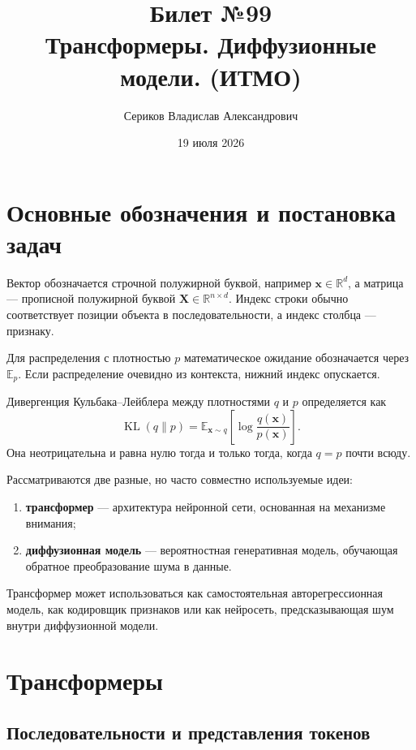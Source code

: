 \documentclass[12pt,a4paper]{article}
\title{Билет №99 \\ \small Трансформеры. Диффузионные модели. (ИТМО)}
\author{Сериков Владислав Александрович}
\date{19 июля 2026}
\theoremstyle{definition}
\newcommand{\R}{\mathbb{R}}
\newcommand{\E}{\mathbb{E}}
\newcommand{\KL}{\operatorname{KL}}
\newcommand{\1}{\mathbf{1}}
\begin{document}
\maketitle
\tableofcontents
\newpage

\section{Основные обозначения и постановка задач}

Вектор обозначается строчной полужирной буквой, например
$\bm{x}\in\R^d$, а матрица --- прописной полужирной буквой
$\bm{X}\in\R^{n\times d}$. Индекс строки обычно соответствует позиции
объекта в последовательности, а индекс столбца --- признаку.

Для распределения с плотностью $p$ математическое ожидание обозначается
через $\E_p$. Если распределение очевидно из контекста, нижний индекс
опускается.

Дивергенция Кульбака--Лейблера между плотностями $q$ и $p$ определяется
как
\[
    \KL(q\|p)
    =
    \E_{\bm{x}\sim q}
    \left[
        \log\frac{q(\bm{x})}{p(\bm{x})}
    \right].
\]
Она неотрицательна и равна нулю тогда и только тогда, когда
$q=p$ почти всюду.

Рассматриваются две разные, но часто совместно используемые идеи:
\begin{enumerate}
    \item \textbf{трансформер} --- архитектура нейронной сети, основанная
    на механизме внимания;
    \item \textbf{диффузионная модель} --- вероятностная генеративная
    модель, обучающая обратное преобразование шума в данные.
\end{enumerate}

Трансформер может использоваться как самостоятельная авторегрессионная
модель, как кодировщик признаков или как нейросеть, предсказывающая шум
внутри диффузионной модели.

\section{Трансформеры}

\subsection{Последовательности и представления токенов}
\end{document}
